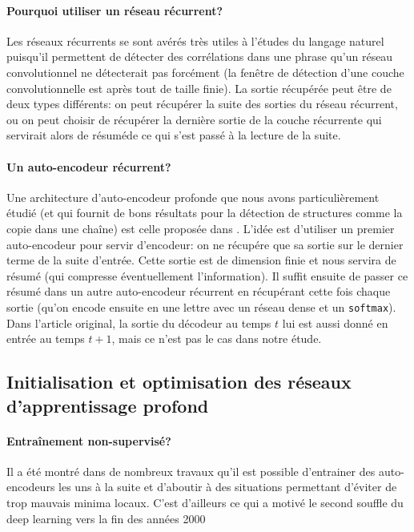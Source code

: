 \documentclass[a4paper,11pt]{article}
\begin{document}
\paragraph{Pourquoi utiliser un réseau récurrent?}

Les réseaux récurrents se sont avérés très utiles à l'études du langage naturel
puisqu'il permettent de détecter des corrélations dans une phrase qu'un réseau
convolutionnel ne détecterait pas forcément (la fenêtre de détection d'une
couche convolutionnelle est après tout de taille finie).  La sortie récupérée
peut être de deux types différents: on peut récupérer la suite des sorties du
réseau récurrent, ou on peut choisir de récupérer la dernière sortie de la
couche récurrente qui servirait alors de \og résumé\fg de ce qui s'est passé à
la lecture de la suite.

\paragraph{Un auto-encodeur récurrent?}

Une architecture d'auto-encodeur profonde que nous avons particulièrement étudié
(et qui fournit de bons résultats pour la détection de structures comme la copie
dans une chaîne) est celle proposée dans \cite{DBLP:journals/corr/ChoMGBSB14}.
L'idée est d'utiliser un premier auto-encodeur pour servir d'encodeur: on ne
récupére que sa sortie sur le dernier terme de la suite d'entrée. Cette sortie
est de dimension finie et nous servira de résumé (qui compresse éventuellement
l'information). Il suffit ensuite de passer ce résumé dans un autre
auto-encodeur récurrent en récupérant cette fois chaque sortie (qu'on encode
ensuite en une lettre avec un réseau dense et un \texttt{softmax}). Dans
l'article original, la sortie du décodeur au temps $t$ lui est aussi donné en
entrée au temps $t+1$, mais ce n'est pas le cas dans notre étude.

\subsection{Initialisation et optimisation des réseaux d'apprentissage profond}

\paragraph{Entraînement non-supervisé?}

Il a été montré dans de nombreux travaux qu'il est possible d'entrainer des
auto-encodeurs les uns à la suite et d'aboutir à des situations permettant
d'éviter de trop mauvais minima locaux. C'est d'ailleurs ce qui a motivé le
second souffle du deep learning vers la fin des années 2000
\end{document}
